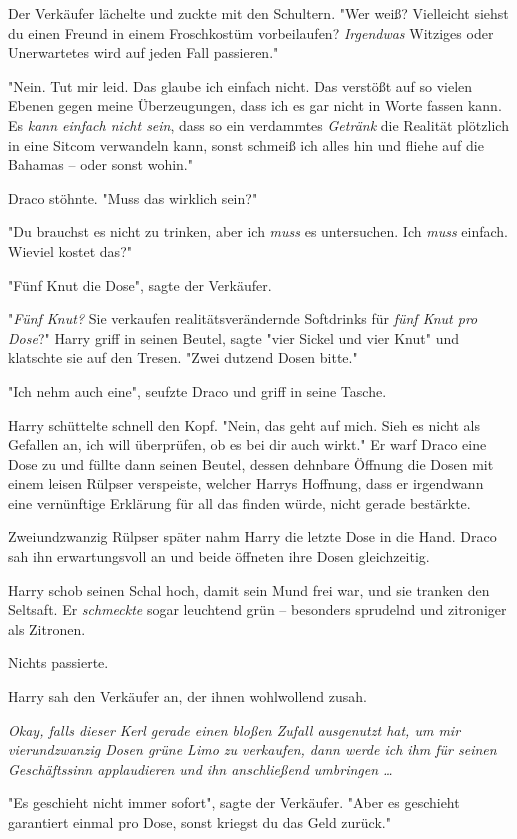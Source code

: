 {Der Verkäufer lächelte und zuckte mit den Schultern. "Wer weiß? Vielleicht siehst du einen Freund in einem Froschkostüm vorbeilaufen? \emph{Irgendwas} Witziges oder Unerwartetes wird auf jeden Fall passieren."

"Nein. Tut mir leid. Das glaube ich einfach nicht. Das verstößt auf so vielen Ebenen gegen meine Überzeugungen, dass ich es gar nicht in Worte fassen kann. Es \emph{kann einfach nicht sein}, dass so ein verdammtes \emph{Getränk} die Realität plötzlich in eine Sitcom verwandeln kann, sonst schmeiß ich alles hin und fliehe auf die Bahamas -- oder sonst wohin."

Draco stöhnte. "Muss das wirklich sein?"

"Du brauchst es nicht zu trinken, aber ich \emph{muss} es untersuchen. Ich \emph{muss} einfach. Wieviel kostet das?"

"Fünf Knut die Dose", sagte der Verkäufer.

"\emph{Fünf Knut?} Sie verkaufen realitätsverändernde Softdrinks für \emph{fünf Knut pro Dose}?" Harry griff in seinen Beutel, sagte "vier Sickel und vier Knut" und klatschte sie auf den Tresen. "Zwei dutzend Dosen bitte."

"Ich nehm auch eine", seufzte Draco und griff in seine Tasche.

Harry schüttelte schnell den Kopf. "Nein, das geht auf mich. Sieh es nicht als Gefallen an, ich will überprüfen, ob es bei dir auch wirkt." Er warf Draco eine Dose zu und füllte dann seinen Beutel, dessen dehnbare Öffnung die Dosen mit einem leisen Rülpser verspeiste, welcher Harrys Hoffnung, dass er irgendwann eine vernünftige Erklärung für all das finden würde, nicht gerade bestärkte.

Zweiundzwanzig Rülpser später nahm Harry die letzte Dose in die Hand. Draco sah ihn erwartungsvoll an und beide öffneten ihre Dosen gleichzeitig.

Harry schob seinen Schal hoch, damit sein Mund frei war, und sie tranken den Seltsaft. Er \emph{schmeckte} sogar leuchtend grün -- besonders sprudelnd und zitroniger als Zitronen.

Nichts passierte.

Harry sah den Verkäufer an, der ihnen wohlwollend zusah.

\emph{Okay, falls dieser Kerl gerade einen bloßen Zufall ausgenutzt hat, um mir vierundzwanzig Dosen grüne Limo zu verkaufen, dann werde ich ihm für seinen Geschäftssinn applaudieren und ihn anschließend umbringen …}

"Es geschieht nicht immer sofort", sagte der Verkäufer. "Aber es geschieht garantiert einmal pro Dose, sonst kriegst du das Geld zurück."

}
